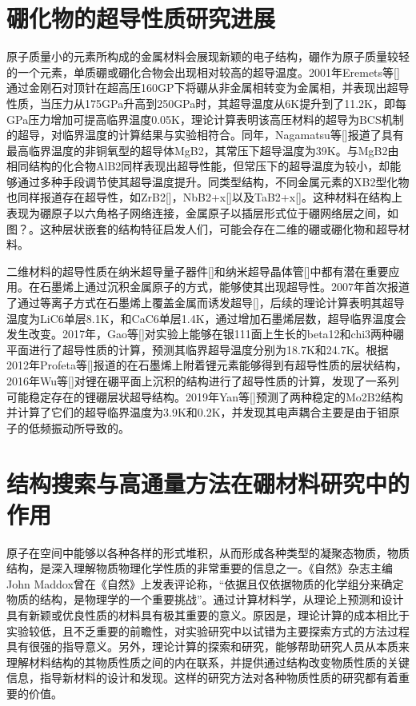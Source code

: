 \documentclass[phd,nobackinfo]{scutthesis}
\begin{document}
\section{硼化物的超导性质研究进展}
原子质量小的元素所构成的金属材料会展现新颖的电子结构，硼作为原子质量较轻的一个元素，单质硼或硼化合物会出现相对较高的超导温度。2001年Eremets等[]通过金刚石对顶针在超高压160GP下将硼从非金属相转变为金属相，并表现出超导性质，当压力从175GPa升高到250GPa时，其超导温度从6K提升到了11.2K，即每GPa压力增加可提高临界温度0.05K，理论计算表明该高压材料的超导为BCS机制的超导，对临界温度的计算结果与实验相符合。同年，Nagamatsu等[]报道了具有最高临界温度的非铜氧型的超导体MgB2，其常压下超导温度为39K。与MgB2由相同结构的化合物AlB2同样表现出超导性能，但常压下的超导温度为较小，却能够通过多种手段调节使其超导温度提升。同类型结构，不同金属元素的XB2型化物也同样报道存在超导性，如ZrB2[]，NbB2+x[]以及TaB2+x[]。这种材料在结构上表现为硼原子以六角格子网络连接，金属原子以插层形式位于硼网络层之间，如图？。这种层状嵌套的结构特征启发人们，可能会存在二维的硼或硼化物和超导材料。

二维材料的超导性质在纳米超导量子器件[]和纳米超导晶体管[]中都有潜在重要应用。在石墨烯上通过沉积金属原子的方式，能够使其出现超导性。2007年首次报道了通过等离子方式在石墨烯上覆盖金属而诱发超导[]，后续的理论计算表明其超导温度为LiC6单层8.1K，和CaC6单层1.4K，通过增加石墨烯层数，超导临界温度会发生改变。2017年，Gao等[]对实验上能够在银111面上生长的beta12和chi3两种硼平面进行了超导性质的计算，预测其临界超导温度分别为18.7K和24.7K。根据2012年Profeta等[]报道的在石墨烯上附着锂元素能够得到有超导性质的层状结构，2016年Wu等[]对锂在硼平面上沉积的结构进行了超导性质的计算，发现了一系列可能稳定存在的锂硼层状超导结构。2019年Yan等[]预测了两种稳定的Mo2B2结构并计算了它们的超导临界温度为3.9K和0.2K，并发现其电声耦合主要是由于钼原子的低频振动所导致的。

\section{结构搜索与高通量方法在硼材料研究中的作用}
原子在空间中能够以各种各样的形式堆积，从而形成各种类型的凝聚态物质，物质结构，是深入理解物质物理化学性质的非常重要的信息之一。《自然》杂志主编John Maddox曾在《自然》上发表评论称，“依据且仅依据物质的化学组分来确定物质的结构，是物理学的一个重要挑战”。通过计算材料学，从理论上预测和设计具有新颖或优良性质的材料具有极其重要的意义。原因是，理论计算的成本相比于实验较低，且不乏重要的前瞻性，对实验研究中以试错为主要探索方式的方法过程具有很强的指导意义。另外，理论计算的探索和研究，能够帮助研究人员从本质来理解材料结构的其物质性质之间的内在联系，并提供通过结构改变物质性质的关键信息，指导新材料的设计和发现。这样的研究方法对各种物质性质的研究都有着重要的价值。
\end{document}
